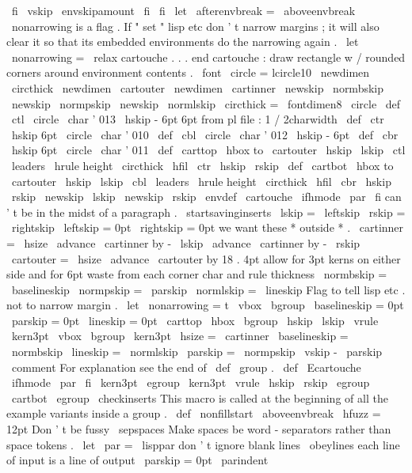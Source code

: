 {{{{\
fi
\
vskip
\
envskipamount
\
fi
\
fi
}
}
\
let
\
afterenvbreak
=
\
aboveenvbreak
%
\
nonarrowing
is
a
flag
.
If
"
set
"
lisp
etc
don
'
t
narrow
margins
;
it
will
%
also
clear
it
so
that
its
embedded
environments
do
the
narrowing
again
.
\
let
\
nonarrowing
=
\
relax
%
cartouche
.
.
.
end
cartouche
:
draw
rectangle
w
/
rounded
corners
around
%
environment
contents
.
\
font
\
circle
=
lcircle10
\
newdimen
\
circthick
\
newdimen
\
cartouter
\
newdimen
\
cartinner
\
newskip
\
normbskip
\
newskip
\
normpskip
\
newskip
\
normlskip
\
circthick
=
\
fontdimen8
\
circle
%
\
def
\
ctl
{
{
\
circle
\
char
'
013
\
hskip
-
6pt
}
}
%
6pt
from
pl
file
:
1
/
2charwidth
\
def
\
ctr
{
{
\
hskip
6pt
\
circle
\
char
'
010
}
}
\
def
\
cbl
{
{
\
circle
\
char
'
012
\
hskip
-
6pt
}
}
\
def
\
cbr
{
{
\
hskip
6pt
\
circle
\
char
'
011
}
}
\
def
\
carttop
{
\
hbox
to
\
cartouter
{
\
hskip
\
lskip
\
ctl
\
leaders
\
hrule
height
\
circthick
\
hfil
\
ctr
\
hskip
\
rskip
}
}
\
def
\
cartbot
{
\
hbox
to
\
cartouter
{
\
hskip
\
lskip
\
cbl
\
leaders
\
hrule
height
\
circthick
\
hfil
\
cbr
\
hskip
\
rskip
}
}
%
\
newskip
\
lskip
\
newskip
\
rskip
\
envdef
\
cartouche
{
%
\
ifhmode
\
par
\
fi
%
can
'
t
be
in
the
midst
of
a
paragraph
.
\
startsavinginserts
\
lskip
=
\
leftskip
\
rskip
=
\
rightskip
\
leftskip
=
0pt
\
rightskip
=
0pt
%
we
want
these
*
outside
*
.
\
cartinner
=
\
hsize
\
advance
\
cartinner
by
-
\
lskip
\
advance
\
cartinner
by
-
\
rskip
\
cartouter
=
\
hsize
\
advance
\
cartouter
by
18
.
4pt
%
allow
for
3pt
kerns
on
either
%
side
and
for
6pt
waste
from
%
each
corner
char
and
rule
thickness
\
normbskip
=
\
baselineskip
\
normpskip
=
\
parskip
\
normlskip
=
\
lineskip
%
Flag
to
tell
lisp
etc
.
not
to
narrow
margin
.
\
let
\
nonarrowing
=
t
%
\
vbox
\
bgroup
\
baselineskip
=
0pt
\
parskip
=
0pt
\
lineskip
=
0pt
\
carttop
\
hbox
\
bgroup
\
hskip
\
lskip
\
vrule
\
kern3pt
\
vbox
\
bgroup
\
kern3pt
\
hsize
=
\
cartinner
\
baselineskip
=
\
normbskip
\
lineskip
=
\
normlskip
\
parskip
=
\
normpskip
\
vskip
-
\
parskip
\
comment
%
For
explanation
see
the
end
of
\
def
\
group
.
}
\
def
\
Ecartouche
{
%
\
ifhmode
\
par
\
fi
\
kern3pt
\
egroup
\
kern3pt
\
vrule
\
hskip
\
rskip
\
egroup
\
cartbot
\
egroup
\
checkinserts
}
%
This
macro
is
called
at
the
beginning
of
all
the
example
variants
%
inside
a
group
.
\
def
\
nonfillstart
{
%
\
aboveenvbreak
\
hfuzz
=
12pt
%
Don
'
t
be
fussy
\
sepspaces
%
Make
spaces
be
word
-
separators
rather
than
space
tokens
.
\
let
\
par
=
\
lisppar
%
don
'
t
ignore
blank
lines
\
obeylines
%
each
line
of
input
is
a
line
of
output
\
parskip
=
0pt
\
parindent
}}}
